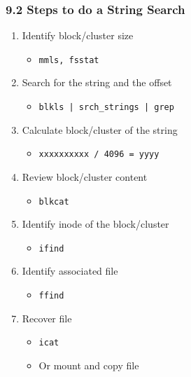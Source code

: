 \begin{frame}[fragile]
  \frametitle{9.2 Steps to do a String Search}
    \begin{enumerate}
       \item Identify block/cluster size
            \begin{itemize}
		\item[] \texttt{mmls, fsstat}
            \end{itemize}
       \item Search for the string and the offset
            \begin{itemize}
		\item[] \texttt{blkls | srch\_strings | grep }
            \end{itemize}
       \item Calculate block/cluster of the string
	    \begin{itemize}
		\item[] \texttt{xxxxxxxxxx / 4096 = yyyy}
            \end{itemize}
       \item Review block/cluster content
	    \begin{itemize}
		\item[] \texttt{blkcat}
            \end{itemize}
       \item Identify inode of the block/cluster
	    \begin{itemize}
		\item[] \texttt{ifind}
            \end{itemize}
       \item Identify associated file
	    \begin{itemize}
		\item[] \texttt{ffind}
            \end{itemize}
       \item Recover file
	    \begin{itemize}
		\item[] \texttt{icat}
		\item[] Or mount and copy file
            \end{itemize}
    \end{enumerate}
\end{frame}


\newcommand{\seti}{\setcounter{saveenumi}{\value{enumi}}}
\newcommand{\conti}{\setcounter{enumi}{\value{saveenumi}}}

